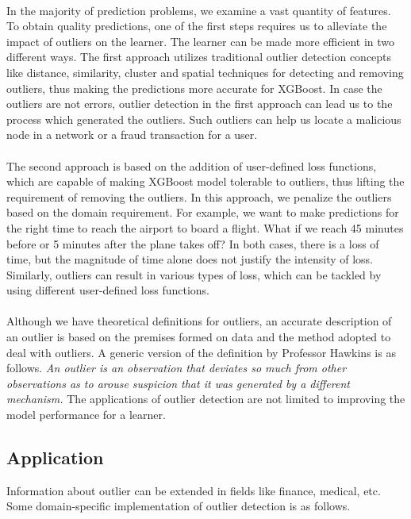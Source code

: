 \documentclass[runningheads]{llncs}
\begin{document}
\paragraph{} In the majority of prediction problems, we examine a vast quantity of features. To obtain quality predictions, one of the first steps requires us to alleviate the impact of outliers on the learner. The learner can be made more efficient in two different ways. The first approach utilizes traditional outlier detection concepts like distance, similarity, cluster and spatial techniques for detecting and removing outliers, thus making the predictions more accurate for XGBoost. In case the outliers are not errors, outlier detection in the first approach can lead us to the process which generated the outliers. Such outliers can help us locate a malicious node in a network or a fraud transaction for a user. 

\paragraph{}The second approach is based on the addition of user-defined loss functions, which are capable of making XGBoost model tolerable to outliers, thus lifting the requirement of removing the outliers. In this approach, we penalize the outliers based on the domain requirement. For example, we want to make predictions for the right time to reach the airport to board a flight. What if we reach 45 minutes before or 5 minutes after the plane takes off? In both cases, there is a loss of time, but the magnitude of time alone does not justify the intensity of loss. Similarly, outliers can result in various types of loss, which can be tackled by using different user-defined loss functions.
\
\paragraph{} Although we have theoretical definitions for outliers, an accurate description of an outlier is based on the premises formed on data and the method adopted to deal with outliers. A generic version of the definition by Professor Hawkins is as follows. \textit{An outlier is an observation that deviates so much from other observations as to arouse suspicion that it was generated by a different mechanism.
} The applications of outlier detection are not limited to improving the model performance for a learner. 

\subsection{Application}
Information about outlier can be extended in fields like finance, medical, etc. Some domain-specific implementation of outlier detection is as follows.
\end{document}
